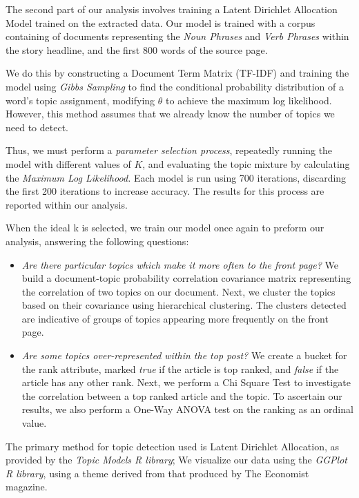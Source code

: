 \documentclass[11pt,journal,final,a4paper]{IEEEtran}
\begin{document}
The second part of our analysis involves training a Latent Dirichlet Allocation Model trained on the extracted data. Our model is trained with a corpus containing of documents representing the \textit{Noun Phrases} and \textit{Verb Phrases} within the story headline, and the first 800 words of the source page.

We do this by constructing a Document Term Matrix (TF-IDF) and training the model using \textit{Gibbs Sampling} to find the conditional probability distribution of a word's topic assignment, modifying $\theta$ to achieve the maximum log likelihood. However, this method assumes that we already know the number of topics we need to detect.

Thus, we must perform a \textit{parameter selection process}, repeatedly running the model with different values of $K$, and evaluating the topic mixture by calculating the \textit{Maximum Log Likelihood.} Each model is run using 700 iterations, discarding the first 200 iterations to increase accuracy. The results for this process are reported within our analysis. 


When the ideal k is selected, we train our model once again to preform our analysis, answering the following questions:
\begin{itemize}
\item \textit{Are there particular topics which make it more often to the front page?} We build a document-topic probability correlation covariance matrix representing the correlation of two topics on our document. Next, we cluster the topics based on their covariance using hierarchical clustering. The clusters detected are indicative of groups of topics appearing more frequently on the front page.
\item \textit{Are some topics over-represented within the top post?} We create a bucket for the rank attribute, marked \textit{true} if the article is top ranked, and \textit{false} if the article has any other rank. Next, we perform a Chi Square Test\cite{test:chi} to investigate the correlation between a top ranked article and the topic. To ascertain our results, we also perform a One-Way ANOVA test\cite{test:anova} on the ranking as an ordinal value.
\end{itemize}

The primary method for topic detection used is Latent Dirichlet Allocation, as provided by the \textit{Topic Models R library}\cite{cran:topicmodels}; We visualize our data using the \textit{GGPlot R library}\cite{cran:ggplot}, using a theme derived from that produced by The Economist magazine. 
\end{document}
